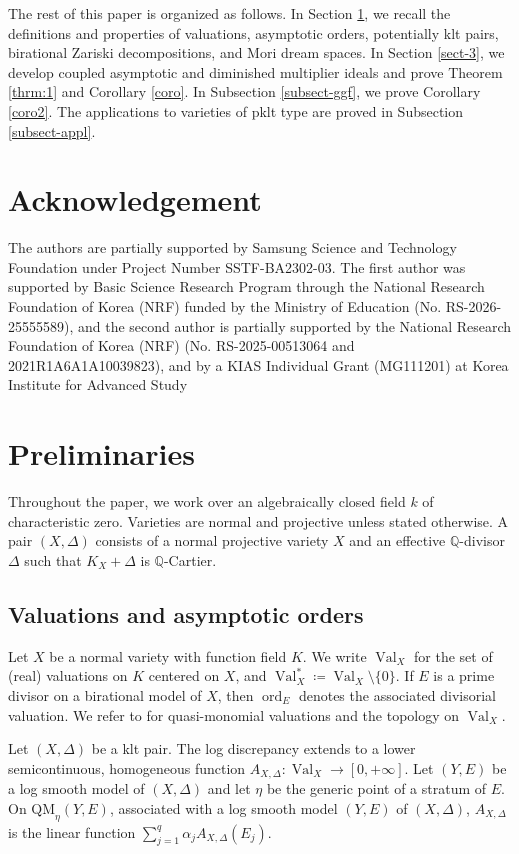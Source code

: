 \documentclass[a4paper,12pt]{amsart}
\theoremstyle{plain}
\theoremstyle{definition}
\numberwithin{equation}{section}
\newcommand{\Q}{\mathbb{Q}}
\DeclareMathOperator{\ord}{ord}
\DeclareMathOperator{\Val}{Val}
\begin{document}
The rest of this paper is organized as follows. In Section \ref{sect-2}, we recall the definitions and properties of valuations, asymptotic orders, potentially klt pairs, birational Zariski decompositions, and Mori dream spaces. In Section \ref{sect-3}, we develop coupled asymptotic and diminished multiplier ideals and prove Theorem \ref{thrm:1} and Corollary \ref{coro}. In Subsection \ref{subsect-ggf}, we prove Corollary \ref{coro2}. The applications to varieties of pklt type are proved in Subsection \ref{subsect-appl}.

\section*{Acknowledgement}
The authors are partially supported by Samsung Science and Technology Foundation under Project Number SSTF-BA2302-03. The first author was supported by Basic Science Research Program through the National Research Foundation of Korea (NRF) funded by the Ministry of Education (No. RS-2026-25555589), and the second author is partially supported by the National Research Foundation of Korea (NRF) (No. RS-2025-00513064 and 2021R1A6A1A10039823), and by a KIAS Individual Grant (MG111201) at Korea Institute for Advanced Study

\section{Preliminaries}\label{sect-2}
Throughout the paper, we work over an algebraically closed field $k$ of characteristic zero. Varieties are normal and projective unless stated otherwise. A pair $(X,\Delta)$ consists of a normal projective variety $X$ and an effective $\Q$-divisor $\Delta$ such that $K_X+\Delta$ is $\Q$-Cartier.

\subsection{Valuations and asymptotic orders}
Let \(X\) be a normal variety with function field \(K\). We write \(\Val_X\) for the set of (real) valuations on \(K\) centered on \(X\), and \(\Val_X^{\ast}\coloneqq \Val_X\setminus \{0\}\). If \(E\) is a prime divisor on a birational model of \(X\), then \(\ord_E\) denotes the associated divisorial valuation. We refer to \cite{JM12} for quasi-monomial valuations and the topology on \(\Val_X\). 

Let \((X,\Delta)\) be a klt pair. The log discrepancy extends to a lower semicontinuous, homogeneous function $A_{X,\Delta}\colon \Val_X\longrightarrow [0,+\infty]$. Let $(Y,E)$ be a log smooth model of $(X,\Delta)$ and let $\eta$ be the generic point of a stratum of $E$. On $\mathrm{QM}_\eta(Y,E)$, associated with a log smooth model $(Y,E)$ of $(X,\Delta)$, $A_{X,\Delta}$ is the linear function $\sum_{j=1}^q \alpha_j A_{X,\Delta}(E_j)$.
\end{document}
